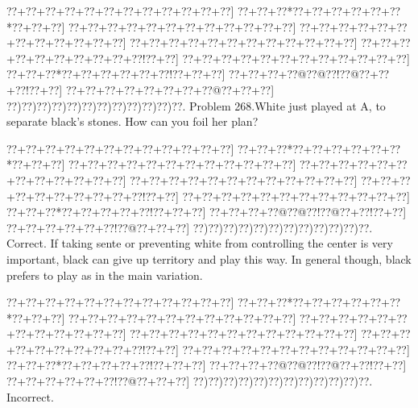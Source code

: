 \documentclass[a5paper]{article}
\begin{document}
\newpage
\begin{center}
{\goo
\0??+\0??+\0??+\0??+\0??+\0??+\0??+\0??+\0??+\0??+\0??+\0??]
\0??+\0??+\0??*\0??+\0??+\0??+\0??+\0??+\0??*\0??+\0??+\0??]
\0??+\0??+\0??+\0??+\0??+\0??+\0??+\0??+\0??+\0??+\0??+\0??]
\0??+\0??+\0??+\0??+\0??+\0??+\0??+\0??+\0??+\0??+\0??+\0??]
\0??+\0??+\0??+\0??+\0??+\0??+\0??+\0??+\0??+\0??+\0??+\0??]
\0??+\0??+\0??+\0??+\0??+\0??+\0??+\0??+\0??+\0??!\0??+\0??]
\0??+\0??+\0??+\0??+\0??+\0??+\0??+\0??+\0??+\0??+\0??+\0??]
\0??+\0??+\0??*\0??+\0??+\0??+\0??+\0??+\0??!\0??+\0??+\0??]
\0??+\0??+\0??+\0??@\0??@\0??!\0??@\0??+\0??+\0??!\0??+\0??]
\0??+\0??+\0??+\0??+\0??+\0??+\0??+\0??@\0??+\0??+\0??]
\0??)\0??)\0??)\0??)\0??)\0??)\0??)\0??)\0??)\0??)\0??)\0??.
}
Problem 268.White just played at A, to separate black's stones. How can you foil her plan?

\end{center}
\begin{center}
{\goo
\0??+\0??+\0??+\0??+\0??+\0??+\0??+\0??+\0??+\0??+\0??+\0??]
\0??+\0??+\0??*\0??+\0??+\0??+\0??+\0??+\0??*\0??+\0??+\0??]
\0??+\0??+\0??+\0??+\0??+\0??+\0??+\0??+\0??+\0??+\0??+\0??]
\0??+\0??+\0??+\0??+\0??+\0??+\0??+\0??+\0??+\0??+\0??+\0??]
\0??+\0??+\0??+\0??+\0??+\0??+\0??+\0??+\0??+\0??+\0??+\0??]
\0??+\0??+\0??+\0??+\0??+\0??+\0??+\0??+\0??+\0??!\0??+\0??]
\0??+\0??+\0??+\0??+\0??+\0??+\0??+\0??+\0??+\0??+\0??+\0??]
\0??+\0??+\0??*\0??+\0??+\0??+\0??+\0??!\0??+\0??+\0??]
\0??+\0??+\0??+\0??@\0??@\0??!\0??@\0??+\0??!\0??+\0??]
\0??+\0??+\0??+\0??+\0??+\0??!\0??@\0??+\0??+\0??]
\0??)\0??)\0??)\0??)\0??)\0??)\0??)\0??)\0??)\0??)\0??)\0??.
}
Correct. If taking sente or preventing white from controlling the center is very important, black can give up territory and play this way. In general though, black prefers to play as in the main variation.

\end{center}
\begin{center}
{\goo
\0??+\0??+\0??+\0??+\0??+\0??+\0??+\0??+\0??+\0??+\0??+\0??]
\0??+\0??+\0??*\0??+\0??+\0??+\0??+\0??+\0??*\0??+\0??+\0??]
\0??+\0??+\0??+\0??+\0??+\0??+\0??+\0??+\0??+\0??+\0??+\0??]
\0??+\0??+\0??+\0??+\0??+\0??+\0??+\0??+\0??+\0??+\0??+\0??]
\0??+\0??+\0??+\0??+\0??+\0??+\0??+\0??+\0??+\0??+\0??+\0??]
\0??+\0??+\0??+\0??+\0??+\0??+\0??+\0??+\0??+\0??!\0??+\0??]
\0??+\0??+\0??+\0??+\0??+\0??+\0??+\0??+\0??+\0??+\0??+\0??]
\0??+\0??+\0??*\0??+\0??+\0??+\0??+\0??!\0??+\0??+\0??]
\0??+\0??+\0??+\0??@\0??@\0??!\0??@\0??+\0??!\0??+\0??]
\0??+\0??+\0??+\0??+\0??+\0??!\0??@\0??+\0??+\0??]
\0??)\0??)\0??)\0??)\0??)\0??)\0??)\0??)\0??)\0??)\0??)\0??.
}
Incorrect. 

\end{center}
\end{document}
